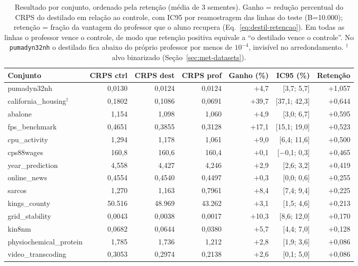 \begin{table}[htbp]
\centering
\caption[Resultado da destilação distribucional por conjunto]{Resultado
por conjunto, ordenado pela retenção (média de 3 sementes). Ganho =
redução percentual do CRPS do destilado em relação ao controle, com
IC95 por reamostragem das linhas do teste (B=10.000); retenção =
fração da vantagem do professor que o aluno recupera
(Eq.~\ref{eq:destil-retencao}). Em todas as linhas o professor vence o
controle, de modo que retenção positiva equivale a ``o destilado vence
o controle''. No \texttt{pumadyn32nh} o destilado fica abaixo do
próprio professor por menos de $10^{-4}$, invisível no arredondamento.
$^\dagger$alvo binarizado (Seção~\ref{sec:met-datasets}).}
\label{tab:destil-retencao}
\scriptsize
\setlength{\tabcolsep}{4pt}
\begin{tabular}{lrrrrrr}
\toprule
Conjunto & CRPS ctrl & CRPS dest & CRPS prof & Ganho (\%) & IC95 (\%) & Retenção \\
\midrule
pumadyn32nh & 0,0130 & 0,0124 & 0,0124 & $+$4,7 & [3,7; 5,7] & $+$1,057 \\
california\_housing$^\dagger$ & 0,1802 & 0,1086 & 0,0691 & $+$39,7 & [37,1; 42,3] & $+$0,644 \\
abalone & 1,154 & 1,098 & 1,060 & $+$4,9 & [3,0; 6,7] & $+$0,595 \\
fps\_benchmark & 0,4651 & 0,3855 & 0,3128 & $+$17,1 & [15,1; 19,0] & $+$0,523 \\
cpu\_activity & 1,294 & 1,178 & 1,061 & $+$9,0 & [6,4; 11,6] & $+$0,500 \\
cps88wages & 160,8 & 160,6 & 160,4 & $+$0,1 & [$-$0,1; 0,3] & $+$0,465 \\
year\_prediction & 4,558 & 4,427 & 4,246 & $+$2,9 & [2,6; 3,2] & $+$0,419 \\
online\_news & 0,4554 & 0,4540 & 0,4497 & $+$0,3 & [0,0; 0,6] & $+$0,255 \\
sarcos & 1,270 & 1,163 & 0,7961 & $+$8,4 & [7,4; 9,4] & $+$0,225 \\
kings\_county & 50.516 & 48.969 & 43.262 & $+$3,1 & [1,5; 4,6] & $+$0,213 \\
grid\_stability & 0,0043 & 0,0038 & 0,0017 & $+$10,3 & [8,6; 12,0] & $+$0,170 \\
kin8nm & 0,0682 & 0,0644 & 0,0380 & $+$5,7 & [4,4; 7,0] & $+$0,128 \\
physiochemical\_protein & 1,785 & 1,736 & 1,212 & $+$2,8 & [1,9; 3,6] & $+$0,086 \\
video\_transcoding & 0,3053 & 0,2974 & 0,2138 & $+$2,6 & [0,1; 5,0] & $+$0,086 \\

\end{tabular}
\end{table}
